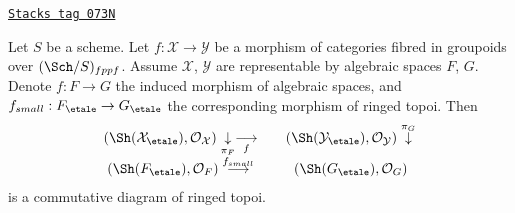\begin{lemma}
\label{stacks-sheaves-lemma-compare-morphism}
\href{https://stacks.math.columbia.edu/tag/073N}{\texttt{Stacks tag 073N}}

Let $S$ be a scheme. Let $f : \mathcal{X} \to \mathcal{Y}$ be a morphism
of categories fibred in groupoids over $(\Sch/S)_{fppf}$. Assume
$\mathcal{X}$, $\mathcal{Y}$ are representable by algebraic spaces $F$, $G$.
Denote $f : F \to G$ the induced morphism of algebraic spaces, and
$f_{small} : F_\etale \to G_\etale$
the corresponding morphism of ringed topoi. Then
$$
\begin{array}{ccc}(\Sh(\mathcal{X}_\etale), \mathcal{O}_\mathcal{X})
\underset{\pi_F}{\downarrow}\underset{f}{\longrightarrow} &  & (\Sh(\mathcal{Y}_\etale), \mathcal{O}_\mathcal{Y}) \overset{\pi_G}{\downarrow} \\ (\Sh(F_\etale), \mathcal{O}_F) \overset{f_{small}}{\longrightarrow} &  & (\Sh(G_\etale), \mathcal{O}_G)\end{array}
$$
is a commutative diagram of ringed topoi.
\end{lemma}

